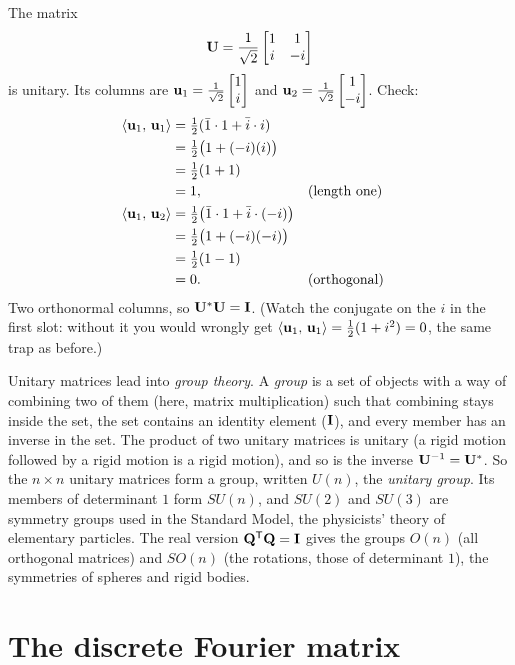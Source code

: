 \begin{example}\label{ch32:unitaryex}
The matrix
\[
  \mathbf{U} = \frac{1}{\sqrt 2}\begin{bmatrix}1 & 1 \\ i & -i\end{bmatrix}
\]
is unitary. Its columns are $\mathbf{u}_1=\tfrac1{\sqrt2}\begin{bmatrix}1\\i\end{bmatrix}$ and
$\mathbf{u}_2=\tfrac1{\sqrt2}\begin{bmatrix}1\\-i\end{bmatrix}$. Check:
\begin{align*}
  \langle \mathbf{u}_1,\, \mathbf{u}_1 \rangle &= \tfrac12(\bar 1\cdot 1 + \bar i\cdot i) \\
  &= \tfrac12\bigl(1 + (-i)(i)\bigr) \\
  &= \tfrac12(1+1) \\
  &= 1, && \text{(length one)}\\
  \langle \mathbf{u}_1,\, \mathbf{u}_2 \rangle &= \tfrac12\bigl(\bar 1\cdot 1 + \bar i\cdot(-i)\bigr) \\
  &= \tfrac12\bigl(1 + (-i)(-i)\bigr) \\
  &= \tfrac12(1-1) \\
  &= 0. && \text{(orthogonal)}
\end{align*}
Two orthonormal columns, so $\mathbf{U}^{*}\mathbf{U}=\mathbf{I}$. (Watch the conjugate on the
$i$ in the first slot: without it you would wrongly get $\langle \mathbf{u}_1,\, \mathbf{u}_1 \rangle=\tfrac12(1+i^2)=0$, the same trap as before.)
\end{example}

\begin{connectionbox}
Unitary matrices lead into \emph{group theory}. A \emph{group} is a set of
objects with a way of combining two of them (here, matrix multiplication) such that
combining stays inside the set, the set contains an identity element ($\mathbf{I}$),
and every member has an inverse in the set. The product of two unitary matrices is
unitary (a rigid motion followed by a rigid motion is a rigid motion), and so is
the inverse $\mathbf{U}^{-1}=\mathbf{U}^{*}$. So the $n\times n$ unitary matrices form a
group, written $U(n)$, the \emph{unitary group}. Its members of determinant $1$
form $SU(n)$, and $SU(2)$ and $SU(3)$ are symmetry groups used in the Standard
Model, the physicists' theory of elementary particles. The real version
$\mathbf{Q}^{\mathsf{T}}\mathbf{Q}=\mathbf{I}$ gives the groups $O(n)$ (all orthogonal matrices) and
$SO(n)$ (the rotations, those of determinant $1$), the symmetries of spheres and
rigid bodies.
\end{connectionbox}

\section{The discrete Fourier matrix}


